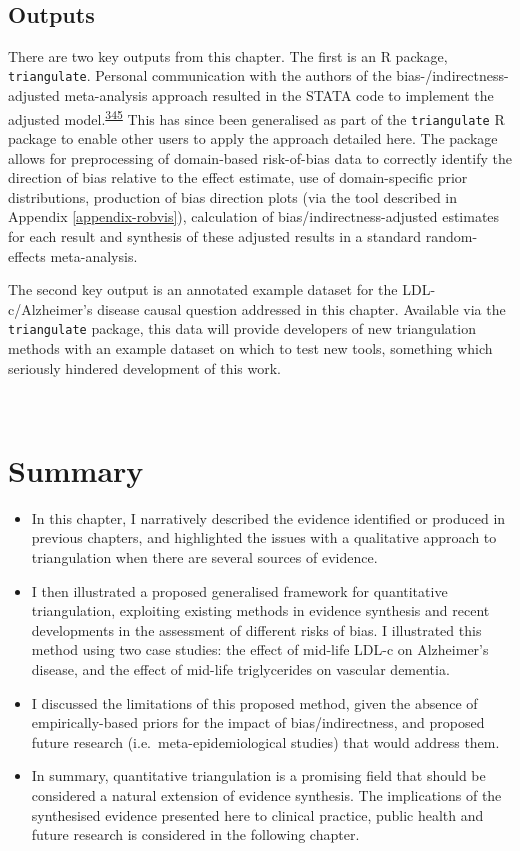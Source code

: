 \documentclass[a4paper, twoside]{templates/ociamthesis}
\begin{document}
~

\hypertarget{tri-software}{%
\subsection{Outputs}\label{tri-software}}

There are two key outputs from this chapter. The first is an R package, \texttt{triangulate}. Personal communication with the authors of the bias-/indirectness-adjusted meta-analysis approach resulted in the STATA code to implement the adjusted model.\textsuperscript{\protect\hyperlink{ref-turner2009}{345}} This has since been generalised as part of the \texttt{triangulate} R package to enable other users to apply the approach detailed here. The package allows for preprocessing of domain-based risk-of-bias data to correctly identify the direction of bias relative to the effect estimate, use of domain-specific prior distributions, production of bias direction plots (via the tool described in Appendix \ref{appendix-robvis}), calculation of bias/indirectness-adjusted estimates for each result and synthesis of these adjusted results in a standard random-effects meta-analysis.

The second key output is an annotated example dataset for the LDL-c/Alzheimer's disease causal question addressed in this chapter. Available via the \texttt{triangulate} package, this data will provide developers of new triangulation methods with an example dataset on which to test new tools, something which seriously hindered development of this work.

~

\hypertarget{summary-6}{%
\section{Summary}\label{summary-6}}

\begin{itemize}
\item
  In this chapter, I narratively described the evidence identified or produced in previous chapters, and highlighted the issues with a qualitative approach to triangulation when there are several sources of evidence.
\item
  I then illustrated a proposed generalised framework for quantitative triangulation, exploiting existing methods in evidence synthesis and recent developments in the assessment of different risks of bias. I illustrated this method using two case studies: the effect of mid-life LDL-c on Alzheimer's disease, and the effect of mid-life triglycerides on vascular dementia.
\item
  I discussed the limitations of this proposed method, given the absence of empirically-based priors for the impact of bias/indirectness, and proposed future research (i.e.~meta-epidemiological studies) that would address them.
\item
  In summary, quantitative triangulation is a promising field that should be considered a natural extension of evidence synthesis. The implications of the synthesised evidence presented here to clinical practice, public health and future research is considered in the following chapter.
\end{itemize}
\end{document}
